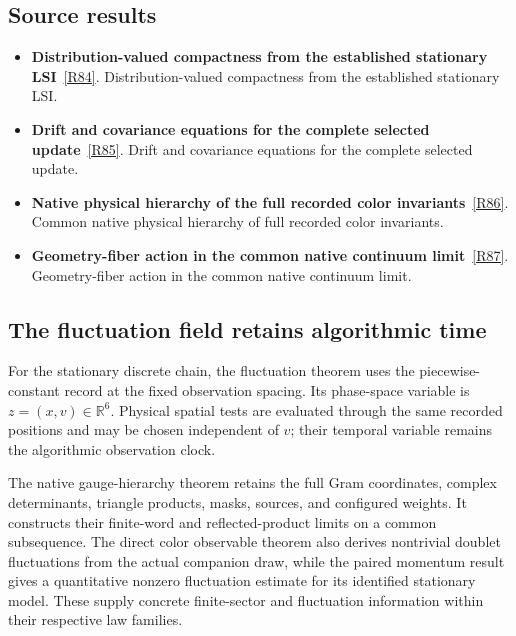 \documentclass[11pt,a4paper]{article}
\begin{document}
\subsection*{Source results}
\begin{itemize}
\item \textbf{Distribution-valued compactness from the established stationary LSI}~\hyperref[src:thm-ym-spacetime-fluctuation-compactness]{[R84]}. Distribution-valued compactness from the established stationary LSI.
\item \textbf{Drift and covariance equations for the complete selected update}~\hyperref[src:prop-ym-complete-fluctuation-equations]{[R85]}. Drift and covariance equations for the complete selected update.
\item \textbf{Native physical hierarchy of the full recorded color invariants}~\hyperref[src:thm-ym-native-physical-gauge-hierarchy]{[R86]}. Common native physical hierarchy of full recorded color invariants.
\item \textbf{Geometry-fiber action in the common native continuum limit}~\hyperref[src:thm-ym-native-fiber-continuum]{[R87]}. Geometry-fiber action in the common native continuum limit.
\end{itemize}
\subsection*{The fluctuation field retains algorithmic time}
For the stationary discrete chain, the fluctuation theorem uses the piecewise-constant record at the fixed observation spacing. Its phase-space variable is \(z=(x,v)\in\mathbb R^6\). Physical spatial tests are evaluated through the same recorded positions and may be chosen independent of \(v\); their temporal variable remains the algorithmic observation clock.

The native gauge-hierarchy theorem retains the full Gram coordinates, complex determinants, triangle products, masks, sources, and configured weights. It constructs their finite-word and reflected-product limits on a common subsequence. The direct color observable theorem also derives nontrivial doublet fluctuations from the actual companion draw, while the paired momentum result gives a quantitative nonzero fluctuation estimate for its identified stationary model. These supply concrete finite-sector and fluctuation information within their respective law families.
\end{document}
